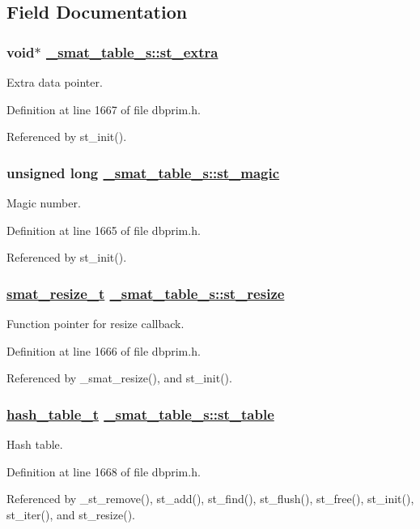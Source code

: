 \subsection{Field Documentation}
\hypertarget{struct__smat__table__s_o2}{
\subsubsection[st\_\-extra]{\setlength{\rightskip}{0pt plus 5cm}void$\ast$ \hyperlink{struct__smat__table__s_o2}{\_\-smat\_\-table\_\-s::st\_\-extra}}}
\label{struct__smat__table__s_o2}


Extra data pointer. 

Definition at line 1667 of file dbprim.h.

Referenced by st\_\-init().\hypertarget{struct__smat__table__s_o0}{
\subsubsection[st\_\-magic]{\setlength{\rightskip}{0pt plus 5cm}unsigned long \hyperlink{struct__smat__table__s_o0}{\_\-smat\_\-table\_\-s::st\_\-magic}}}
\label{struct__smat__table__s_o0}


Magic number. 

Definition at line 1665 of file dbprim.h.

Referenced by st\_\-init().\hypertarget{struct__smat__table__s_o1}{
\subsubsection[st\_\-resize]{\setlength{\rightskip}{0pt plus 5cm}\hyperlink{group__dbprim__smat_ga3}{smat\_\-resize\_\-t} \hyperlink{struct__smat__table__s_o1}{\_\-smat\_\-table\_\-s::st\_\-resize}}}
\label{struct__smat__table__s_o1}


Function pointer for resize callback. 

Definition at line 1666 of file dbprim.h.

Referenced by \_\-smat\_\-resize(), and st\_\-init().\hypertarget{struct__smat__table__s_o3}{
\subsubsection[st\_\-table]{\setlength{\rightskip}{0pt plus 5cm}\hyperlink{struct__hash__table__s}{hash\_\-table\_\-t} \hyperlink{struct__smat__table__s_o3}{\_\-smat\_\-table\_\-s::st\_\-table}}}
\label{struct__smat__table__s_o3}


Hash table. 

Definition at line 1668 of file dbprim.h.

Referenced by \_\-st\_\-remove(), st\_\-add(), st\_\-find(), st\_\-flush(), st\_\-free(), st\_\-init(), st\_\-iter(), and st\_\-resize().